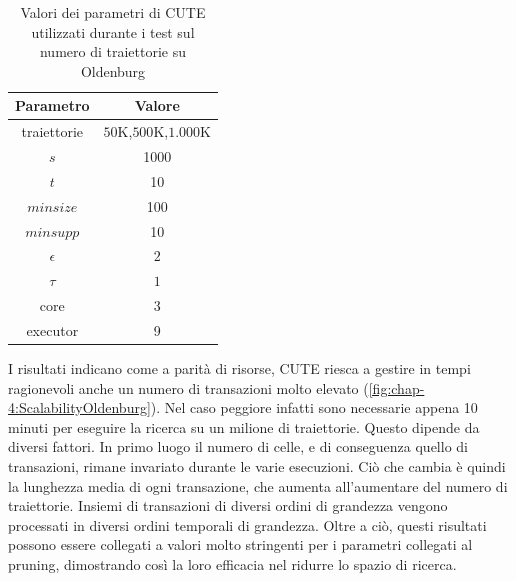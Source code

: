 \begin{table}[H]
    \centering
   \begin{tabular}{||c c||}
 \hline
     Parametro & Valore \\ [0.4ex] 
 \hline\hline
 traiettorie & \(50\)K,\(500\)K,\(1.000\)K \\
 \hline
 \(s\) & 1000 \\
 \hline
 \(t\) & 10 \\
 \hline
 \(minsize\) & 100 \\
 \hline
  \(minsupp\) & 10 \\
 \hline
  \(\epsilon\) & \(2\) \\
 \hline
 \(\tau\) & \(1\) \\
 \hline
   core & 3 \\
 \hline
  executor & 9 \\
 \hline
\end{tabular}
    \caption{Valori dei parametri di CUTE utilizzati durante i test sul numero di traiettorie su Oldenburg}
    \label{tab:variation-oldenburg}
\end{table}

I risultati indicano come a parità di risorse, CUTE riesca a gestire in tempi ragionevoli anche un numero di transazioni molto elevato (\cref{fig:chap-4:ScalabilityOldenburg}).
Nel caso peggiore infatti sono necessarie appena 10 minuti per eseguire la ricerca su un milione di traiettorie.
Questo dipende da diversi fattori.
In primo luogo il numero di celle, e di conseguenza quello di transazioni, rimane invariato durante le varie esecuzioni.
Ciò che cambia è quindi la lunghezza media di ogni transazione, che aumenta all'aumentare del numero di traiettorie.
Insiemi di transazioni di diversi ordini di grandezza vengono processati in diversi ordini temporali di grandezza.
Oltre a ciò, questi risultati possono essere collegati a valori molto stringenti per i parametri collegati al pruning, dimostrando così la loro efficacia nel ridurre lo spazio di ricerca.



